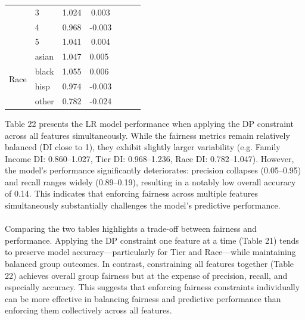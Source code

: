 \documentclass{article}
\begin{document}
\begin{table}[H]
\begin{tabular}{llcc|ccc}
                               & 3     & 1.024                  & 0.003                      &                                       &                                    &                              \\
                               & 4     & 0.968                  & -0.003                     &                                       &                                    &                              \\
                               & 5     & 1.041                  & 0.004                      &                                       &                                    &                              \\
\cline{1-4}
\multirow{4}{*}{Race}          & asian & 1.047                  & \multicolumn{1}{l|}{0.005}  &                                       &                                    &                              \\
                               & black & 1.055                  & \multicolumn{1}{l|}{0.006}  &                                       &                                    &                              \\
                               & hisp  & 0.974                  & \multicolumn{1}{l|}{-0.003} &                                       &                                    &                              \\
                               & other & 0.782                  & \multicolumn{1}{l|}{-0.024} &                                       &                                    &                              \\
\end{tabular}
\end{table}
Table 22 presents the LR model performance when applying the DP constraint across all features simultaneously. While the fairness metrics remain relatively balanced (DI close to 1), they exhibit slightly larger variability (e.g. Family Income DI: 0.860–1.027, Tier DI: 0.968–1.236, Race DI: 0.782–1.047). However, the model’s performance significantly deteriorates: precision collapses (0.05–0.95) and recall ranges widely (0.89–0.19), resulting in a notably low overall accuracy of 0.14. This indicates that enforcing fairness across multiple features simultaneously substantially challenges the model’s predictive performance.\\ \\
Comparing the two tables highlights a trade-off between fairness and performance. Applying the DP constraint one feature at a time (Table 21) tends to preserve model accuracy—particularly for Tier and Race—while maintaining balanced group outcomes. In contrast, constraining all features together (Table 22) achieves overall group fairness but at the expense of precision, recall, and especially accuracy. This suggests that enforcing fairness constraints individually can be more effective in balancing fairness and predictive performance than enforcing them collectively across all features.
\end{document}
